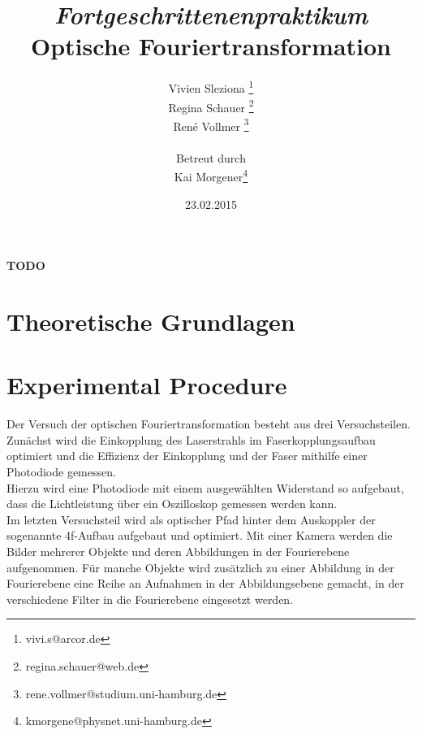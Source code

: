 \documentclass[12pt,a4paper]{article}
\begin{document}
	
	\textbf{TODO}
	
	
	
	\title{\textit{Fortgeschrittenenpraktikum}\\\textbf{Optische Fouriertransformation} }
	\date{23.02.2015}
	\author{Vivien Sleziona \footnote{vivi.s@arcor.de}\\ Regina Schauer \footnote{regina.schauer@web.de}\\ René Vollmer \footnote{rene.vollmer@studium.uni-hamburg.de} \\ \\Betreut durch\\ Kai Morgener\footnote{kmorgene@physnet.uni-hamburg.de}}
	
	\maketitle
	
	\begin{center} 
		\bigskip
		\bigskip
		
		\begin{minipage}{0.75\textwidth}
			
		\end{minipage}
	\end{center}
	
	\newpage
	
	\tableofcontents
	\vfill
	\newpage
	\clearpage	
	
	
	\section{Theoretische Grundlagen}
	
	

	
	\newpage
	\clearpage
	
	\section{Experimental Procedure} %
		Der Versuch der optischen Fouriertransformation besteht aus drei Versuchsteilen. Zunächst wird die Einkopplung des Laserstrahls im Faserkopplungsaufbau optimiert und die Effizienz der Einkopplung und der Faser mithilfe einer Photodiode gemessen. \\
		Hierzu wird eine Photodiode mit einem ausgewählten Widerstand so aufgebaut, dass die Lichtleistung über ein Oszilloskop gemessen werden kann.\\
		Im letzten Versuchsteil wird als optischer Pfad hinter dem Auskoppler der sogenannte 4f-Aufbau aufgebaut und optimiert. Mit einer Kamera werden die Bilder mehrerer Objekte und deren Abbildungen in der Fourierebene aufgenommen. Für manche Objekte wird zusätzlich zu einer Abbildung in der Fourierebene eine Reihe an Aufnahmen in der Abbildungsebene gemacht, in der verschiedene Filter in die Fourierebene eingesetzt werden.   
		
\end{document}

